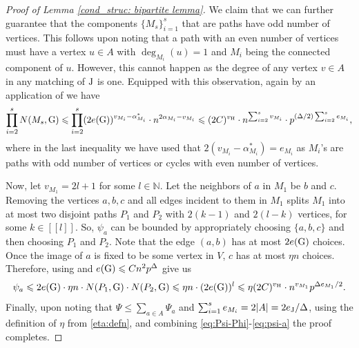 \documentclass[a4paper,11pt,english,reqno]{amsart}
\numberwithin{equation}{section}
\renewcommand{\leq}{\leqslant}
\newcommand{\N}{\mathbb{N}}
\newcommand{\uH}{\textup{H}}
\newcommand{\tu}[1]{\textup{#1}}
\newcommand{\set}[1]{[\![#1]\!]}
\begin{document}
\begin{proof}[Proof of Lemma \ref{cond_struc: bipartite lemma}]
				We claim that we can further guarantee that the components $\{M_s\}_{i=1}^s$ that are paths have odd number of vertices. This follows upon noting that a path with an even number of vertices must have a vertex $u \in A$ with $\deg_{M_i}(u)=1$ and $M_i$ being the connected component of $u$. However, this cannot happen as the degree of any vertex $v\in A$ in any matching of $\tu{J}$ is one. Equipped with this observation, again by an application of \cite[Theorem~5.4]{HMS} we have
				\begin{equation}
					\label{cond_struc: comp bound}
					\prod_{i=2}^{s} N(M_{s}, \tu{G}) \leq \prod_{i=2}^{s} (2e(\tu{G}))^{v_{M_{i}}-\alpha_{M_{i}}^{*}}\cdot n^{2\alpha_{M_{i}}-v_{M_{i}}} \leq (2C)^{v_{\uH}}\cdot n^{\sum_{i=2}^{s}v_{M_{i}}}\cdot p^{(\Delta/2)\sum_{i=2}^{s}e_{M_{i}} },
				\end{equation}  
				where in the last inequality we have used that $2(v_{M_{i}}- \alpha^*_{M_{i}})=e_{M_{i}}$ as $M_{i}$'s are paths with odd number of vertices or cycles with even number of vertices. 
				
				Now, let $v_{M_{1}}=2l+1$ for some $l\in \N$. 
				Let the neighbors of $a$ in $M_{1}$ be $b$ and $c$. Removing the vertices ${a,b,c}$ and all edges incident to them in $M_{1}$ splits $M_{1}$ into at most two disjoint paths $P_{1}$ and $P_{2}$ with $2(k-1)$ and $2(l-k)$ vertices, for some $k\in \set{l}$. So, $\psi_{a}$ can be bounded by appropriately choosing $\{a,b,c\}$ and then choosing $P_1$ and $P_2$. Note that the edge $(a,b)$ has at most $2e(\tu{G})$ choices. Once the image of $a$ is fixed to be some vertex in $V$, $c$ has at most $\eta n$ choices. Therefore, using \cite[Theorem~5.4]{HMS} and $e(\tu{G})\leq Cn^{2}p^{\Delta}$ give us
				\begin{equation}\label{eq:psi-a}
					\psi_{a}\leq 2e(\tu{G})\cdot \eta n\cdot N(P_{1}, \tu{G})\cdot N(P_{2}, \tu{G}) \leq \eta n\cdot (2e(\tu{G}))^{l}\leq \eta (2C)^{v_{\uH}}\cdot  n^{v_{M_1}}p^{\Delta e_{M_1}/2}.
				\end{equation}
				Finally,  upon noting that $\Psi \leq \sum_{a\in A}\Psi_{a}$ and $\sum_{i=1}^{s}e_{M_{i}} = 2|A|= 2e_{\tu{J}}/\Delta$, using the definition of $\eta$ from \eqref{eta:defn}, and combining \eqref{eq:Psi-Phi}-\eqref{eq:psi-a} the proof completes.
			\end{proof}
			
\end{document}
